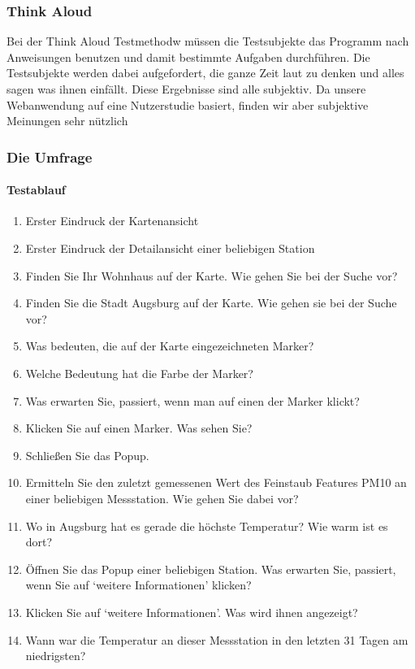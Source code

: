 \subsubsection{Think Aloud}

Bei der Think Aloud Testmethodw müssen die Testsubjekte das Programm nach Anweisungen benutzen und damit bestimmte Aufgaben durchführen. Die Testsubjekte werden dabei aufgefordert, die ganze Zeit laut zu denken und alles sagen was ihnen einfällt. Diese Ergebnisse sind alle subjektiv. Da unsere Webanwendung auf eine Nutzerstudie basiert, finden wir aber subjektive Meinungen sehr nützlich

\subsubsection{Die Umfrage}

\paragraph{Testablauf}
\begin{enumerate}
    \item Erster Eindruck der Kartenansicht
 \item Erster Eindruck der Detailansicht einer beliebigen Station
  \item Finden Sie Ihr Wohnhaus auf der Karte. Wie  gehen Sie bei der Suche vor?
 \item  Finden Sie die Stadt Augsburg auf der Karte. Wie gehen sie bei der Suche vor?
 \item Was bedeuten, die auf der Karte eingezeichneten Marker?
  \item Welche Bedeutung hat die Farbe der Marker?
\item Was erwarten Sie, passiert, wenn man auf einen der Marker klickt?
\item Klicken Sie auf einen Marker. Was sehen Sie?
 \item Schließen Sie das Popup.
\item Ermitteln Sie den zuletzt gemessenen Wert des Feinstaub Features PM10 an einer beliebigen Messstation. Wie gehen Sie dabei vor?
\item Wo in Augsburg hat es gerade die höchste Temperatur? Wie warm ist es dort?
\item Öffnen Sie das Popup einer beliebigen Station. Was erwarten Sie, passiert, wenn Sie auf ‘weitere Informationen’ klicken?
\item Klicken Sie auf ‘weitere Informationen’. Was wird ihnen angezeigt?
\item Wann war die Temperatur an dieser Messstation in den letzten 31 Tagen am niedrigsten?

\end{enumerate}
